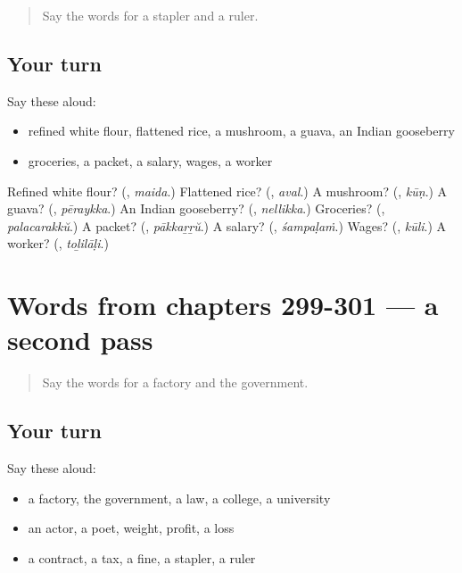 \begin{quote}
Say the words for a stapler and a ruler.
\end{quote}

\subsection*{Your turn}
Say these aloud:

\begin{itemize}
\raggedright
  \item refined white flour, flattened rice, a mushroom, a guava, an Indian gooseberry
  \item groceries, a packet, a salary, wages, a worker
\end{itemize}

\begin{tcolorbox}[breakable,colback=teal!4,colframe=teal!35!black,title={Before you move on}]
Refined white flour? (\textbf{}, \emph{maida}.) Flattened rice? (\textbf{}, \emph{aval}.) A mushroom? (\textbf{}, \emph{kūṇ}.) A guava? (\textbf{}, \emph{pēraykka}.) An Indian gooseberry? (\textbf{}, \emph{nellikka}.) Groceries? (\textbf{}, \emph{palacarakkŭ}.) A packet? (\textbf{}, \emph{pākkaṟṟŭ}.) A salary? (\textbf{}, \emph{śampaḷaṁ}.) Wages? (\textbf{}, \emph{kūli}.) A worker? (\textbf{}, \emph{toḻilāḷi}.)
\end{tcolorbox}
\section[(dialogue)]{Words from chapters 299-301 — a second pass}

\label{lesson:ML-R301-second-pass-words-from-chapters-299-301}



\begin{quote}
Say the words for a factory and the government.
\end{quote}

\subsection*{Your turn}
Say these aloud:

\begin{itemize}
\raggedright
  \item a factory, the government, a law, a college, a university
  \item an actor, a poet, weight, profit, a loss
  \item a contract, a tax, a fine, a stapler, a ruler
\end{itemize}

